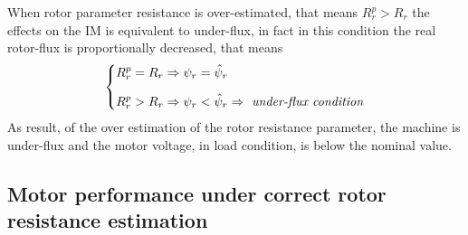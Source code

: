 \documentclass[11pt,a4paper,oneside]{book}
\numberwithin{equation}{section}
\theoremstyle{it}
\theoremstyle{definition}
\begin{document}
When rotor parameter resistance is over-estimated, that means $R_r^p > R_r$ the effects on the IM is equivalent to under-flux, in fact in this condition the real rotor-flux is proportionally decreased, that means 
\begin{equation}\label{eq66}
	\left\{
	\begin{split} 
		R_r^p & = R_r  \Rightarrow \psi_r = \hat{\psi}_{r}  \\[6pt]
		R_r^p & > R_r  \Rightarrow \psi_r < \hat{\psi}_{r}  \Rightarrow \textrm{ \textit{under-flux condition}}
	\end{split}
	\right.
\end{equation}
As result, of the over estimation of the rotor resistance parameter, the machine is under-flux and the motor voltage, in load condition, is below the nominal value.

\subsection{Motor performance under correct rotor resistance estimation}
\end{document}
